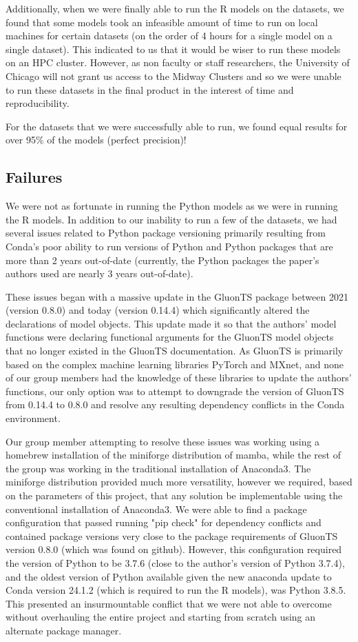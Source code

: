 Additionally, when we were finally able to run the R models on the datasets, we found that some models took an infeasible amount of time to run on local machines for certain datasets (on the order of 4 hours for a single model on a single dataset). This indicated to us that it would be wiser to run these models on an HPC cluster. However, as non faculty or staff researchers, the University of Chicago will not grant us access to the Midway Clusters and so we were unable to run these datasets in the final product in the interest of time and reproducibility. 

For the datasets that we were successfully able to run, we found equal results for over 95\% of the models (perfect precision)!


\subsection{Failures}
We were not as fortunate in running the Python models as we were in running the R models. In addition to our inability to run a few of the datasets, we had several issues related to Python package versioning primarily resulting from Conda's poor ability to run versions of Python and Python packages that are more than 2 years out-of-date (currently, the Python packages the paper's authors used are nearly 3 years out-of-date).

These issues began with a massive update in the GluonTS package between 2021 (version 0.8.0) and today (version 0.14.4) which significantly altered the declarations of model objects. This update made it so that the authors' model functions were declaring functional arguments for the GluonTS model objects that no longer existed in the GluonTS documentation. As GluonTS is primarily based on the complex machine learning libraries PyTorch and MXnet, and none of our group members had the knowledge of these libraries to update the authors' functions, our only option was to attempt to downgrade the version of GluonTS from 0.14.4 to 0.8.0 and resolve any resulting dependency conflicts in the Conda environment. 

Our group member attempting to resolve these issues was working using a homebrew installation of the miniforge distribution of mamba, while the rest of the group was working in the traditional installation of Anaconda3. The miniforge distribution provided much more versatility, however we required, based on the parameters of this project, that any solution be implementable using the conventional installation of Anaconda3. We were able to find a package configuration that passed running "pip check" for dependency conflicts and contained package versions very close to the package requirements of GluonTS version 0.8.0 (which was found on github). However, this configuration required the version of Python to be 3.7.6 (close to the author's version of Python 3.7.4), and the oldest version of Python available given the new anaconda update to Conda version 24.1.2 (which is required to run the R models), was Python 3.8.5. This presented an insurmountable conflict that we were not able to overcome without overhauling the entire project and starting from scratch using an alternate package manager.

